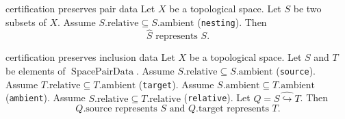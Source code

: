 \begin{cleanresult}{certification preserves pair data}
Let $X$ be a topological space.
Let $S$ be two subsets of $X$.
Assume $S.\mathrm{relative}\subseteq S.\mathrm{ambient}$ (\texttt{nesting}).
Then \[\widehat{S}\text{ represents }S.\]
\end{cleanresult}

\begin{cleanresult}{certification preserves inclusion data}
Let $X$ be a topological space.
Let $S$ and $T$ be elements of $\operatorname{SpacePairData}$.
Assume $S.\mathrm{relative}\subseteq S.\mathrm{ambient}$ (\texttt{source}).
Assume $T.\mathrm{relative}\subseteq T.\mathrm{ambient}$ (\texttt{target}).
Assume $S.\mathrm{ambient}\subseteq T.\mathrm{ambient}$ (\texttt{ambient}).
Assume $S.\mathrm{relative}\subseteq T.\mathrm{relative}$ (\texttt{relative}).
Let $Q = \widehat{S\hookrightarrow T}$.
Then \[Q.\mathrm{source}\text{ represents }S\text{ and }Q.\mathrm{target}\text{ represents }T.\]
\end{cleanresult}

